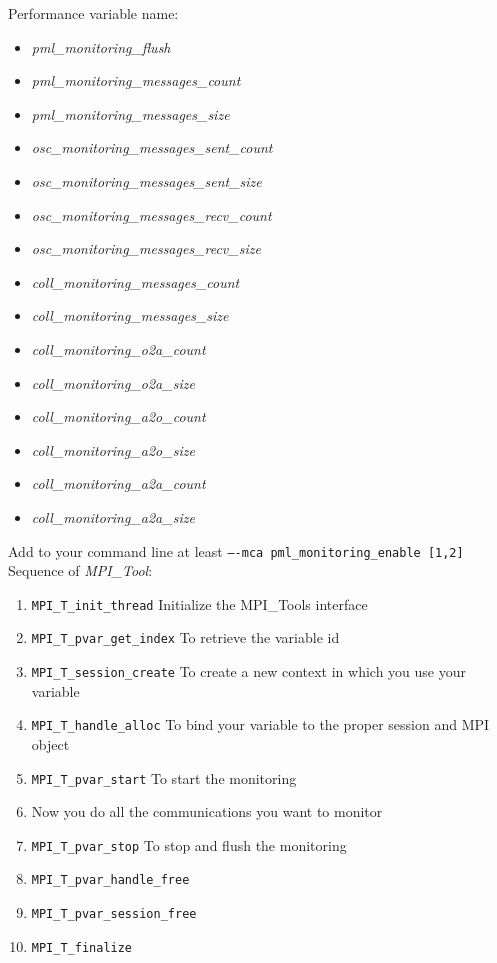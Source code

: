 \documentclass[notitlepage]{article}
\newcommand{\mpit}[1]{\textit{MPI\_Tool#1}}
\begin{document}
Performance variable name:
\begin{itemize}
\item \textit{pml\_monitoring\_flush}
\item \textit{pml\_monitoring\_messages\_count}
\item \textit{pml\_monitoring\_messages\_size}
\item \textit{osc\_monitoring\_messages\_sent\_count}
\item \textit{osc\_monitoring\_messages\_sent\_size}
\item \textit{osc\_monitoring\_messages\_recv\_count}
\item \textit{osc\_monitoring\_messages\_recv\_size}
\item \textit{coll\_monitoring\_messages\_count}
\item \textit{coll\_monitoring\_messages\_size}
\item \textit{coll\_monitoring\_o2a\_count}
\item \textit{coll\_monitoring\_o2a\_size}
\item \textit{coll\_monitoring\_a2o\_count}
\item \textit{coll\_monitoring\_a2o\_size}
\item \textit{coll\_monitoring\_a2a\_count}
\item \textit{coll\_monitoring\_a2a\_size}
\end{itemize}
Add to your command line at least \texttt{----mca pml\_monitoring\_enable [1,2]} \\
Sequence of \mpit{}:
\begin{enumerate}
\item {\texttt{MPI\_T\_init\_thread}} Initialize the MPI\_Tools
  interface
\item {\texttt{MPI\_T\_pvar\_get\_index}} To retrieve the variable id
\item {\texttt{MPI\_T\_session\_create}} To create a new context
  in which you use your variable
\item {\texttt{MPI\_T\_handle\_alloc}} To bind your variable to the
  proper session and MPI object
\item {\texttt{MPI\_T\_pvar\_start}} To start the monitoring
\item Now you do all the communications you want to monitor
\item {\texttt{MPI\_T\_pvar\_stop}} To stop and flush the monitoring
\item {\texttt{MPI\_T\_pvar\_handle\_free}}
\item {\texttt{MPI\_T\_pvar\_session\_free}}
\item {\texttt{MPI\_T\_finalize}}
\end{enumerate}
\end{document}
